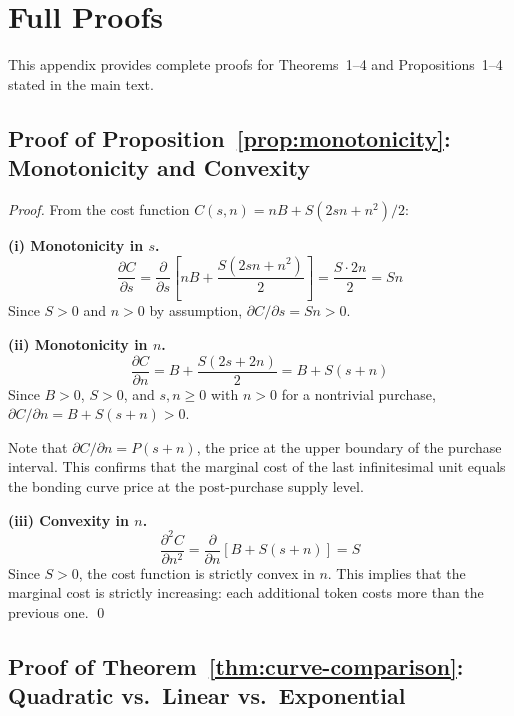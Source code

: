 \section{Full Proofs}
\label{app:proofs}

This appendix provides complete proofs for Theorems~1--4 and Propositions~1--4
stated in the main text.

\subsection{Proof of Proposition~\ref{prop:monotonicity}: Monotonicity and Convexity}

\begin{proof}
From the cost function $C(s, n) = nB + S(2sn + n^2)/2$:

\textbf{(i) Monotonicity in $s$.}
\begin{equation}
  \frac{\partial C}{\partial s} = \frac{\partial}{\partial s}\left[nB + \frac{S(2sn + n^2)}{2}\right] = \frac{S \cdot 2n}{2} = Sn
\end{equation}
Since $S > 0$ and $n > 0$ by assumption, $\partial C / \partial s = Sn > 0$.

\textbf{(ii) Monotonicity in $n$.}
\begin{equation}
  \frac{\partial C}{\partial n} = B + \frac{S(2s + 2n)}{2} = B + S(s + n)
\end{equation}
Since $B > 0$, $S > 0$, and $s, n \geq 0$ with $n > 0$ for a nontrivial
purchase, $\partial C / \partial n = B + S(s + n) > 0$.

Note that $\partial C / \partial n = P(s + n)$, the price at the upper
boundary of the purchase interval. This confirms that the marginal cost of the
last infinitesimal unit equals the bonding curve price at the post-purchase
supply level.

\textbf{(iii) Convexity in $n$.}
\begin{equation}
  \frac{\partial^2 C}{\partial n^2} = \frac{\partial}{\partial n}[B + S(s + n)] = S
\end{equation}
Since $S > 0$, the cost function is strictly convex in $n$. This implies that
the marginal cost is strictly increasing: each additional token costs more than
the previous one. \qed
\end{proof}

\subsection{Proof of Theorem~\ref{thm:curve-comparison}: Quadratic vs.\ Linear vs.\ Exponential}

